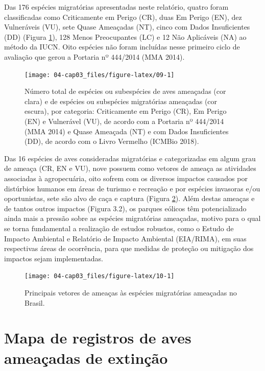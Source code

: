 \documentclass[
  oneside]{scrbook}
\begin{document}
Das 176 espécies migratórias apresentadas neste relatório, quatro foram classificadas como Criticamente em Perigo (CR), duas Em Perigo (EN), dez Vulneráveis (VU), sete Quase Ameaçadas (NT), cinco com Dados Insuficientes (DD) (Figura \ref{fig:09}), 128 Menos Preocupantes (LC) e 12 Não Aplicáveis (NA) ao método da IUCN. Oito espécies não foram incluídas nesse primeiro ciclo de avaliação que gerou a Portaria nº 444/2014 (MMA 2014).

\begin{figure}[H]

{\centering \texttt{[image: 04-cap03\_files/figure-latex/09-1]} 

}

\caption{Número total de espécies ou subespécies de aves ameaçadas (cor clara) e de espécies ou subspécies migratórias ameaçadas (cor escura), por categoria: Criticamente em Perigo (CR), Em Perigo (EN) e Vulnerável (VU), de acordo com a Portaria nº 444/2014 (MMA 2014) e Quase Ameaçada (NT) e com Dados Insuficientes (DD), de acordo com o Livro Vermelho (ICMBio 2018).}\label{fig:09}
\end{figure}

Das 16 espécies de aves consideradas migratórias e categorizadas em algum grau de ameaça (CR, EN e VU), nove possuem como vetores de ameaça as atividades associadas à agropecuária, oito sofrem com os diversos impactos causados por distúrbios humanos em áreas de turismo e recreação e por espécies invasoras e/ou oportunistas, sete são alvo de caça e captura (Figura \ref{fig:10}). Além destas ameaças e de tantos outros impactos (Figura 3.2), os parques eólicos têm potencializado ainda mais a pressão sobre as espécies migratórias ameaçadas, motivo para o qual se torna fundamental a realização de estudos robustos, como o Estudo de Impacto Ambiental e Relatório de Impacto Ambiental (EIA/RIMA), em suas respectivas áreas de ocorrência, para que medidas de proteção ou mitigação dos impactos sejam implementadas.

\begin{figure}[H]

{\centering \texttt{[image: 04-cap03\_files/figure-latex/10-1]} 

}

\caption{Principais vetores de ameaças às espécies migratórias ameaçadas no Brasil.}\label{fig:10}
\end{figure}

\hypertarget{mapa-de-registros-de-aves-ameauxe7adas-de-extinuxe7uxe3o}{%
\section{Mapa de registros de aves ameaçadas de extinção}\label{mapa-de-registros-de-aves-ameauxe7adas-de-extinuxe7uxe3o}}
\end{document}
